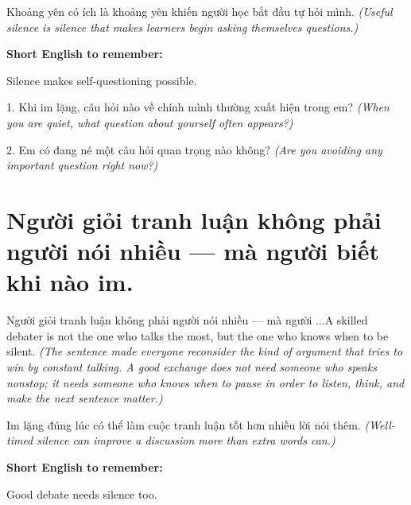 \begin{baihoc}
Khoảng yên có ích là khoảng yên khiến người học bắt đầu tự hỏi mình.
\textit{(Useful silence is silence that makes learners begin asking themselves questions.)}
\end{baihoc}

\begin{ghinhoanh}
\textbf{Short English to remember:}

Silence makes self-questioning possible.

\end{ghinhoanh}

\begin{tuhocnhanh}
1. Khi im lặng, câu hỏi nào về chính mình thường xuất hiện trong em? \textit{(When you are quiet, what question about yourself often appears?)}

2. Em có đang né một câu hỏi quan trọng nào không? \textit{(Are you avoiding any important question right now?)}
\end{tuhocnhanh}
\ngancach


\section{Người giỏi tranh luận không phải người nói nhiều — mà người biết khi nào im.}
\begin{truyen}{Người giỏi tranh luận không phải người nói nhiều — mà người ...}{A skilled debater is not the one who talks the most, but the one who knows when to be silent.}
\textit{(The sentence made everyone reconsider the kind of argument that tries to win by constant talking. A good exchange does not need someone who speaks nonstop; it needs someone who knows when to pause in order to listen, think, and make the next sentence matter.)}
\end{truyen}

\begin{baihoc}
Im lặng đúng lúc có thể làm cuộc tranh luận tốt hơn nhiều lời nói thêm.
\textit{(Well-timed silence can improve a discussion more than extra words can.)}
\end{baihoc}

\begin{ghinhoanh}
\textbf{Short English to remember:}

Good debate needs silence too.

\end{ghinhoanh}

